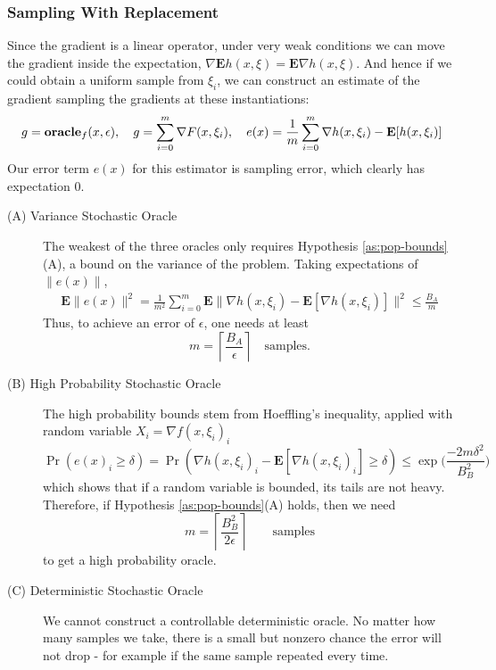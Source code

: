 \subsubsection{Sampling With Replacement} Since the gradient is 
a linear operator, under very weak conditions we can move the gradient
inside the expectation, $\nabla \mathbf{E} h(x,\xi) = \mathbf{E} \nabla h(x, \xi)$.
And hence if we could obtain a uniform sample from $\xi_i$, we can construct an 
estimate of the gradient sampling the gradients at these instantiations:
$$
g = \mbox{\bf oracle}_f(x,\epsilon),\quad g = \sum_{i=0}^m \nabla F(x,\xi_i), \quad e(x) = \frac{1}{m} \sum_{i=0}^m \nabla h(x,\xi_i) - \mathbf{E} [h(x,\xi_i)]
$$
Our error term $e(x)$ for this estimator is sampling error, which clearly has expectation 0. 
\begin{description}

\item[(A) Variance Stochastic Oracle] The weakest of the three oracles only
requires Hypothesis \ref{as:pop-bounds}(A), a bound on the variance of the problem. Taking expectations of
$\|e(x)\|$,
\begin{align*}
\mathbf{E}\|e(x)\|^{2}=\frac{1}{m^{2}}\sum_{i=0}^{m}\mathbf{E}\|\nabla h(x,\xi_{i})-\mathbf{E}[\nabla h(x,\xi_{i})]\|^{2}\leq\frac{B_{A}}{m}
\end{align*}
Thus, to achieve an error of $\epsilon$, one needs at least $$m = \left\lceil \frac{B_A}{\epsilon} \right\rceil \quad \mbox{samples.}$$

\item[(B) High Probability Stochastic Oracle] The high probability bounds
stem from Hoeffling's inequality, applied with random variable $X_i = \nabla f(x,\xi_{i})_i$
$$
\Pr\left(e(x)_i \geq\delta\right)=\Pr\left(\nabla h(x,\xi_{i})_i-\mathbf{E}[\nabla h(x,\xi_{i})_i] \geq\delta\right)\leq\exp\Big(\frac{-2m\delta^{2}}{B_B^{2}}\Big)
$$
which shows that if a random variable is
bounded, its tails are not heavy. Therefore, if Hypothesis \ref{as:pop-bounds}(A) holds, then we need
$$m = \left\lceil \frac{B_B^{2}}{2\epsilon}\right\rceil \qquad \mbox{samples} $$ to get a high probability oracle. 

\item[(C) Deterministic Stochastic Oracle] We cannot construct a
controllable deterministic oracle. No matter how many samples we take, there is
a small but nonzero chance the error will not drop - for example if the same
sample repeated every time. 

\end{description}


